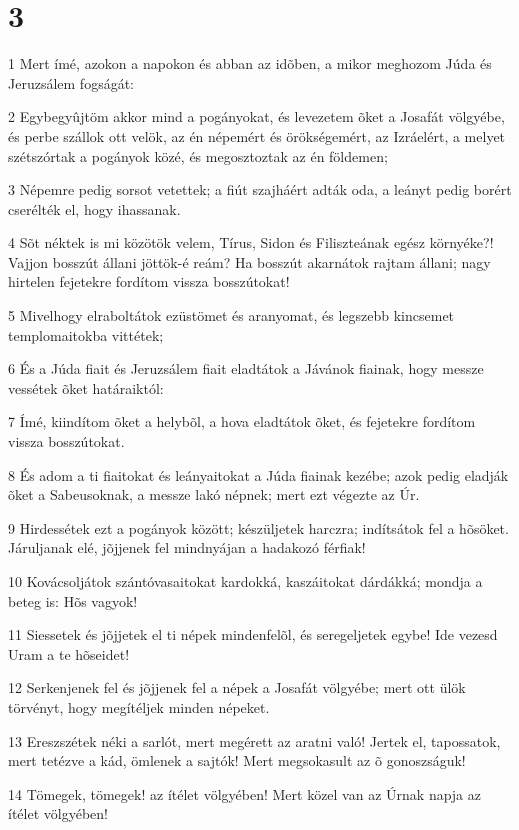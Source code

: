 \chapter{3}

\par 1 Mert ímé, azokon a napokon és abban az idõben, a mikor meghozom Júda és Jeruzsálem fogságát:
\par 2 Egybegyûjtöm akkor mind a pogányokat, és levezetem õket a Josafát völgyébe, és perbe szállok ott velök, az én népemért és örökségemért, az Izráelért, a melyet szétszórtak a pogányok közé, és megosztoztak az én földemen;
\par 3 Népemre pedig sorsot vetettek; a fiút szajháért adták oda, a leányt pedig borért cserélték el, hogy ihassanak.
\par 4 Sõt néktek is mi közötök velem, Tírus, Sidon és Filiszteának egész környéke?! Vajjon bosszút állani jöttök-é reám? Ha bosszút akarnátok rajtam állani; nagy hirtelen fejetekre fordítom vissza bosszútokat!
\par 5 Mivelhogy elraboltátok ezüstömet és aranyomat, és legszebb kincsemet templomaitokba vittétek;
\par 6 És a Júda fiait és Jeruzsálem fiait eladtátok a Jávánok fiainak, hogy messze vessétek õket határaiktól:
\par 7 Ímé, kiindítom õket a helybõl, a hova eladtátok õket, és fejetekre fordítom vissza bosszútokat.
\par 8 És adom a ti fiaitokat és leányaitokat a Júda fiainak kezébe; azok pedig eladják õket a Sabeusoknak, a messze lakó népnek; mert ezt végezte az Úr.
\par 9 Hirdessétek ezt a pogányok között; készüljetek harczra; indítsátok fel a hõsöket. Járuljanak elé, jõjjenek fel mindnyájan a hadakozó férfiak!
\par 10 Kovácsoljátok szántóvasaitokat kardokká, kaszáitokat dárdákká; mondja a beteg is: Hõs vagyok!
\par 11 Siessetek és jõjjetek el ti népek mindenfelõl, és seregeljetek egybe! Ide vezesd Uram a te hõseidet!
\par 12 Serkenjenek fel és jõjjenek fel a népek a Josafát völgyébe; mert ott ülök törvényt, hogy megítéljek minden népeket.
\par 13 Ereszszétek néki a sarlót, mert megérett az aratni való! Jertek el, tapossatok, mert tetézve a kád, ömlenek a sajtók! Mert megsokasult az õ gonoszságuk!
\par 14 Tömegek, tömegek! az ítélet völgyében! Mert közel van az Úrnak napja az ítélet völgyében!
